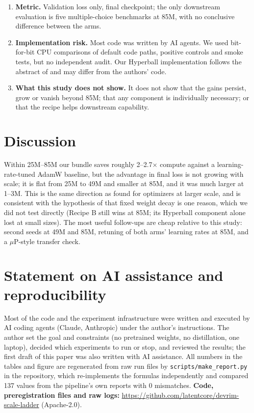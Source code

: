 \documentclass[11pt]{article}
\begin{document}
\begin{enumerate}
\item \textbf{Metric.} Validation loss only, final checkpoint; the only downstream evaluation is five multiple-choice benchmarks at 85M, with no conclusive difference between the arms.
\item \textbf{Implementation risk.} Most code was written by AI agents. We used bit-for-bit CPU comparisons of default code paths, positive controls and smoke tests, but no independent audit. Our Hyperball implementation follows the abstract of \citet{wen2026hyperball} and may differ from the authors' code.
\item \textbf{What this study does not show.} It does not show that the gains persist, grow or vanish beyond 85M; that any component is individually necessary; or that the recipe helps downstream capability.
\end{enumerate}

\section{Discussion}
Within 25M--85M our bundle saves roughly 2--2.7$\times$ compute against a learning-rate-tuned AdamW baseline, but the advantage in final loss is not growing with scale; it is flat from 25M to 49M and smaller at 85M, and it was much larger at 1--3M.
This is the same direction as \citet{wen2025fantastic} found for optimizers at larger scale, and is consistent with the hypothesis of \citet{wen2026hyperball} that fixed weight decay is one reason, which we did not test directly (Recipe B still wins at 85M; its Hyperball component alone lost at small sizes).
The most useful follow-ups are cheap relative to this study: second seeds at 49M and 85M, retuning of both arms' learning rates at 85M, and a $\mu$P-style transfer check.

\section{Statement on AI assistance and reproducibility}\label{sec:ai}
Most of the code and the experiment infrastructure were written and executed by AI coding agents (Claude, Anthropic) under the author's instructions.
The author set the goal and constraints (no pretrained weights, no distillation, one laptop), decided which experiments to run or stop, and reviewed the results; the first draft of this paper was also written with AI assistance.
All numbers in the tables and figure are regenerated from raw run files by \texttt{scripts/make\_report.py} in the repository, which re-implements the formulas independently and compared 137 values from the pipeline's own reports with 0 mismatches.
\textbf{Code, preregistration files and raw logs:} \url{https://github.com/latentcore/devrim-scale-ladder} (Apache-2.0).
\end{document}
